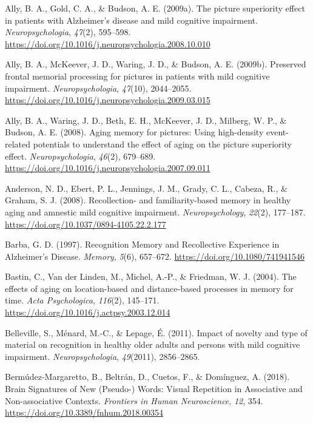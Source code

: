 \documentclass[
  11pt,
]{article}
\begin{document}
\leavevmode\hypertarget{ref-ally2009}{}%
Ally, B. A., Gold, C. A., \& Budson, A. E. (2009a). The picture
superiority effect in patients with Alzheimer's disease and mild
cognitive impairment. \emph{Neuropsychologia}, \emph{47}(2), 595--598.
\url{https://doi.org/10.1016/j.neuropsychologia.2008.10.010}

\leavevmode\hypertarget{ref-ally2009a}{}%
Ally, B. A., McKeever, J. D., Waring, J. D., \& Budson, A. E. (2009b).
Preserved frontal memorial processing for pictures in patients with mild
cognitive impairment. \emph{Neuropsychologia}, \emph{47}(10),
2044--2055. \url{https://doi.org/10.1016/j.neuropsychologia.2009.03.015}

\leavevmode\hypertarget{ref-ally2008}{}%
Ally, B. A., Waring, J. D., Beth, E. H., McKeever, J. D., Milberg, W.
P., \& Budson, A. E. (2008). Aging memory for pictures: Using
high-density event-related potentials to understand the effect of aging
on the picture superiority effect. \emph{Neuropsychologia},
\emph{46}(2), 679--689.
\url{https://doi.org/10.1016/j.neuropsychologia.2007.09.011}

\leavevmode\hypertarget{ref-anderson2008}{}%
Anderson, N. D., Ebert, P. L., Jennings, J. M., Grady, C. L., Cabeza,
R., \& Graham, S. J. (2008). Recollection- and familiarity-based memory
in healthy aging and amnestic mild cognitive impairment.
\emph{Neuropsychology}, \emph{22}(2), 177--187.
\url{https://doi.org/10.1037/0894-4105.22.2.177}

\leavevmode\hypertarget{ref-barba1997}{}%
Barba, G. D. (1997). Recognition Memory and Recollective Experience in
Alzheimer's Disease. \emph{Memory}, \emph{5}(6), 657--672.
\url{https://doi.org/10.1080/741941546}

\leavevmode\hypertarget{ref-bastin2004}{}%
Bastin, C., Van der Linden, M., Michel, A.-P., \& Friedman, W. J.
(2004). The effects of aging on location-based and distance-based
processes in memory for time. \emph{Acta Psychologica}, \emph{116}(2),
145--171. \url{https://doi.org/10.1016/j.actpsy.2003.12.014}

\leavevmode\hypertarget{ref-belleville2011}{}%
Belleville, S., Ménard, M.-C., \& Lepage, É. (2011). Impact of novelty
and type of material on recognition in healthy older adults and persons
with mild cognitive impairment. \emph{Neuropsychologia},
\emph{49}(2011), 2856--2865.

\leavevmode\hypertarget{ref-bermudez-margaretto2018}{}%
Bermúdez-Margaretto, B., Beltrán, D., Cuetos, F., \& Domínguez, A.
(2018). Brain Signatures of New (Pseudo-) Words: Visual Repetition in
Associative and Non-associative Contexts. \emph{Frontiers in Human
Neuroscience}, \emph{12}, 354.
\url{https://doi.org/10.3389/fnhum.2018.00354}
\end{document}
